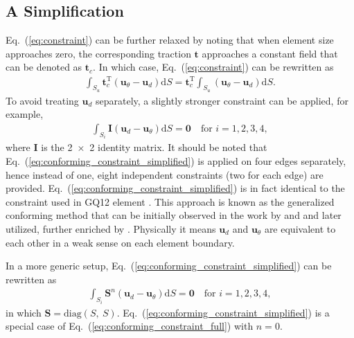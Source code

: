 \documentclass[3p,sort&compress,review,11pt]{elsarticle}
\newcommand*{\md}[1]{\mathrm{d}#1}
\newcommand*{\mT}{\mathrm{T}}
\newcommand*{\eqsref}[1]{Eq.~(\ref{#1})}
\begin{document}
\subsection{A Simplification}
\eqsref{eq:constraint} can be further relaxed by noting that when element size approaches zero, the corresponding traction $\mathbold{t}$ approaches a constant field that can be denoted as $\mathbold{t}_c$. In which case, \eqsref{eq:constraint} can be rewritten as
\begin{gather*}
\int_{S_u}\mathbold{t}_c^\mT\left(\mathbold{u}_\theta-\mathbold{u}_d\right)\md{S}=\mathbold{t}_c^\mT\int_{S_u}\left(\mathbold{u}_\theta-\mathbold{u}_d\right)\md{S}.
\end{gather*}
To avoid treating $\mathbold{u}_d$ separately, a slightly stronger constraint can be applied, for example,
\begin{gather}\label{eq:conforming_constraint_simplified}
\int_{S_i}\mathbold{I}\left(\mathbold{u}_d-\mathbold{u}_\theta\right)\md{S}=\mathbold{0}\quad\text{for $i=1,2,3,4$},
\end{gather}
where $\mathbold{I}$ is the \num{2x2} identity matrix. It should be noted that \eqsref{eq:conforming_constraint_simplified} is applied on four edges separately, hence instead of one, eight independent constraints (two for each edge) are provided. \eqsref{eq:conforming_constraint_simplified} is in fact identical to the constraint used in GQ12 element \citep{Long1994}. This approach is known as the generalized conforming method that can be initially observed in the work by \citet{Tang1984} and \citet{Wu1987} and later utilized,  further enriched by \citet{Long1994}. Physically it means $\mathbold{u}_d$ and $\mathbold{u}_\theta$ are equivalent to each other in a weak sense on each element boundary.

In a more generic setup, \eqsref{eq:conforming_constraint_simplified} can be rewritten as
\begin{gather}\label{eq:conforming_constraint_full}
\int_{S_i}\mathbold{S}^n\left(\mathbold{u}_d-\mathbold{u}_\theta\right)\md{S}=\mathbold{0}\quad\text{for $i=1,2,3,4$},
\end{gather}
in which $\mathbold{S}=\mathrm{diag}(S,~S)$. \eqsref{eq:conforming_constraint_simplified} is a special case of \eqsref{eq:conforming_constraint_full} with $n=0$.
\end{document}

